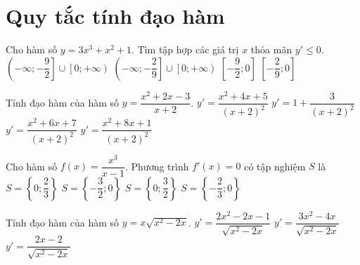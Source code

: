 \section{Quy tắc tính đạo hàm}
\begin{ex}%
	Cho hàm số $y=3x^3+x^2+1$. Tìm tập hợp các giá trị $x$ thỏa mãn $y'\leq 0$.
	\choice
	{$\left(-\infty;-\dfrac{9}{2} \right] \cup \left[0;+\infty\right)$}
	{$\left(-\infty;-\dfrac{2}{9} \right] \cup \left[0;+\infty\right)$}
	{$\left[-\dfrac{9}{2};0\right]$}
	{\True $\left[-\dfrac{2}{9};0\right]$}
	\end{ex}
  \begin{ex}%
 Tính đạo hàm của hàm số $y=\dfrac{x^2+2x-3}{x+2}$.
 \choice
 {$y'=\dfrac{x^2+4x+5}{(x+2)^2} $}
 {\True $y'=1+\dfrac{3}{(x+2)^2} $}
 {$y'=\dfrac{x^2+6x+7}{(x+2)^2} $}
 {$y'=\dfrac{x^2+8x+1}{(x+2)^2} $}
 \end{ex}
  \begin{ex}%
 Cho hàm số $f(x)=\dfrac{x^3}{x-1}$. Phương trình $f'(x)=0$ có tập nghiệm $S$ là
 \choice
 {$S=\left\{ 0; \dfrac{2}{3}\right \}$}
 {$S=\left\{ -\dfrac{3}{2}; 0\right \} $}
 {\True $ S= \left\{0; \dfrac{3}{2}\right \}$}
 {$S= \left\{ - \dfrac{2}{3}; 0 \right \}$}
 \end{ex}
\begin{ex}%
Tính đạo hàm của hàm số $y=x\sqrt{x^2-2x}$.
{$y'=\dfrac{2x^2-2x-1}{\sqrt{x^2-2x}} $}
{$y'=\dfrac{3x^2-4x}{\sqrt{x^2-2x}} $}
{$y'=\dfrac{2x-2}{\sqrt{x^2-2x}} $}
\loigiai{
\[
y'=\sqrt{x^2-2x}+x\cdot \dfrac{2x-2}{2\sqrt{x^2-2x}}=\dfrac{x^2-2x+x(x-1)}{\sqrt{x^2-2x}}=\dfrac{2x^2-3x}{\sqrt{x^2-2x}}.
\]
}
\end{ex}

